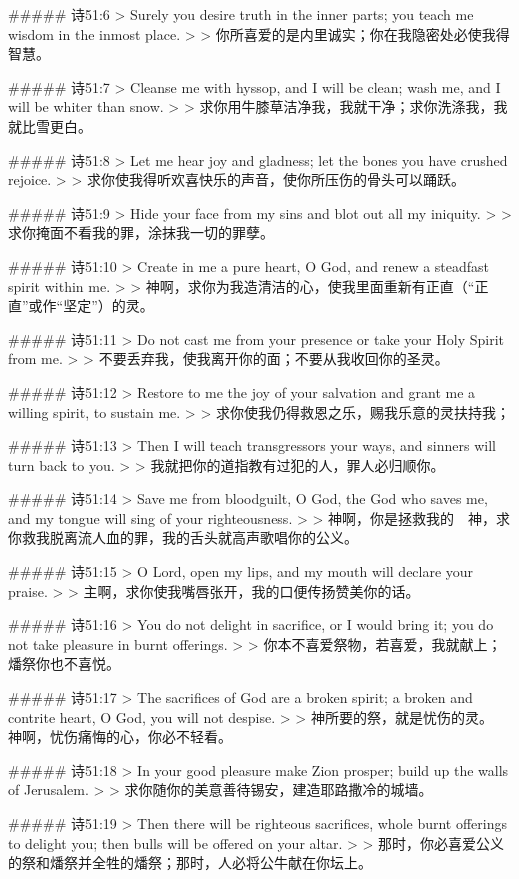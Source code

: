 ##### 诗51:6
> Surely you desire truth in the inner parts; you teach me wisdom in the inmost place.
>
> 你所喜爱的是内里诚实；你在我隐密处必使我得智慧。


##### 诗51:7
> Cleanse me with hyssop, and I will be clean; wash me, and I will be whiter than snow.
>
> 求你用牛膝草洁净我，我就干净；求你洗涤我，我就比雪更白。


##### 诗51:8
> Let me hear joy and gladness; let the bones you have crushed rejoice.
>
> 求你使我得听欢喜快乐的声音，使你所压伤的骨头可以踊跃。


##### 诗51:9
> Hide your face from my sins and blot out all my iniquity.
>
> 求你掩面不看我的罪，涂抹我一切的罪孽。


##### 诗51:10
> Create in me a pure heart, O God, and renew a steadfast spirit within me.
>
> 神啊，求你为我造清洁的心，使我里面重新有正直（“正直”或作“坚定”）的灵。


##### 诗51:11
> Do not cast me from your presence or take your Holy Spirit from me.
>
> 不要丢弃我，使我离开你的面；不要从我收回你的圣灵。


##### 诗51:12
> Restore to me the joy of your salvation and grant me a willing spirit, to sustain me.
>
> 求你使我仍得救恩之乐，赐我乐意的灵扶持我；


##### 诗51:13
> Then I will teach transgressors your ways, and sinners will turn back to you.
>
> 我就把你的道指教有过犯的人，罪人必归顺你。


##### 诗51:14
> Save me from bloodguilt, O God, the God who saves me, and my tongue will sing of your righteousness.
>
> 神啊，你是拯救我的　神，求你救我脱离流人血的罪，我的舌头就高声歌唱你的公义。


##### 诗51:15
> O Lord, open my lips, and my mouth will declare your praise.
>
> 主啊，求你使我嘴唇张开，我的口便传扬赞美你的话。


##### 诗51:16
> You do not delight in sacrifice, or I would bring it; you do not take pleasure in burnt offerings.
>
> 你本不喜爱祭物，若喜爱，我就献上；燔祭你也不喜悦。


##### 诗51:17
> The sacrifices of God are a broken spirit; a broken and contrite heart, O God, you will not despise.
>
> 神所要的祭，就是忧伤的灵。　神啊，忧伤痛悔的心，你必不轻看。


##### 诗51:18
> In your good pleasure make Zion prosper; build up the walls of Jerusalem.
>
> 求你随你的美意善待锡安，建造耶路撒冷的城墙。


##### 诗51:19
> Then there will be righteous sacrifices, whole burnt offerings to delight you; then bulls will be offered on your altar.
>
> 那时，你必喜爱公义的祭和燔祭并全牲的燔祭；那时，人必将公牛献在你坛上。



